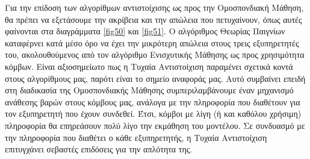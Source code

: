 Για την επίδοση των αλγορίθμων αντιστοίχισης ως προς την Ομοσπονδιακή Μάθηση, θα πρέπει να εξετάσουμε την ακρίβεια και την απώλεια που πετυχαίνουν, όπως αυτές φαίνονται στα διαγράμματα \ref*{fig50} και \ref*{fig51}. Ο αλγόριθμος Θεωρίας Παιγνίων καταφέρνει κατά μέσο όρο να έχει την μικρότερη απώλεια στους τρεις εξυπηρετητές του, ακολουθούμενος από τον αλγόριθμο Ενισχυτικής Μάθησης ως προς χρησιμότητα κόμβων. Είναι αξιοσημείωτο πως η Τυχαία Αντιστοίχιση παραμένει σχετικά κοντά στους αλγορίθμους μας, παρότι είναι το σημείο αναφοράς μας. Αυτό συμβαίνει επειδή στη διαδικασία της Ομοσπονδιακής Μάθησης συμπεριλαμβάνουμε έναν μηχανισμό ανάθεσης βαρών στους κόμβους μας, ανάλογα με την πληροφορία που διαθέτουν για τον εξυπηρετητή που έχουν συνδεθεί. Έτσι, κόμβοι με λίγη (ή και καθόλου χρήσιμη) πληροφορία θα επηρεάσουν πολύ λίγο την εκμάθηση του μοντέλου. Σε συνδυασμό με την πληροφορία που διαθέτει ο κάθε εξυπηρετητής, η Τυχαία Αντιστοίχιση επιτυγχάνει σεβαστές επιδόσεις για την απλότητα της. 